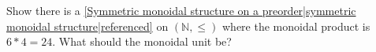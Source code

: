 
Show there is a \ref{Symmetric monoidal structure on a preorder|symmetric monoidal structure|referenced} on $(\mathbb{N}, \leq)$ where the monoidal product is $6*4=24$. What should the monoidal unit be?